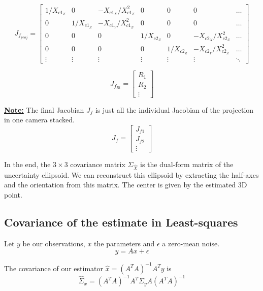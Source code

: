 \begin{equation}
   J_{f_{proj}} = \left[\begin{array}{ccccccc}
       1/X_{c1_Z} & 0 & - X_{c1_X}/X^2_{c1_Z} &0&0&0&\hdots \\
       0 & 1/X_{c1_Z} & - X_{c1_Y}/X^2_{c1_Z} &0&0&0&\hdots \\
       0&0&0& 1/X_{c2_Z} & 0 & - X_{c2_X}/X^2_{c2_Z} &\hdots \\
       0&0&0& 0 & 1/X_{c2_Z} & - X_{c2_Y}/X^2_{c2_Z} &\hdots \\
       \vdots & \vdots & \vdots & \vdots & \vdots & \vdots & \ddots
   \end{array}\right]
\end{equation}

\begin{equation}
    J_{f_{Rt}} = \left[\begin{array}{c}
        R_1 \\ R_2 \\ \vdots
    \end{array}\right]
\end{equation}

\textbf{\underline{Note:}} The final Jacobian $J_f$ is just all the individual Jacobian of the projection in one camera stacked.
\begin{equation}
    J_f = \left[\begin{array}{c}
        J_{f1} \\ J_{f2} \\ \vdots
    \end{array}\right]
\end{equation}

In the end, the $3\times3$ covariance matrix $\Sigma_{\hat{X}}$ is the dual-form matrix of the uncertainty ellipsoid. We can reconstruct this ellipsoid by extracting the half-axes and the orientation from this matrix. The center is given by the estimated 3D point.


\subsection{Covariance of the estimate in Least-squares}
Let $y$ be our observations, $x$ the parameters and $\epsilon$ a zero-mean noise.
\begin{equation}
    y = Ax+\epsilon
\end{equation}

The covariance of our estimator $\hat{x} = (A^T A)^{-1} A^T y$ is
\begin{equation}
    \hat{\Sigma}_x = (A^T A)^{-1} A^T \Sigma_y A (A^T A)^{-1}
\end{equation}

